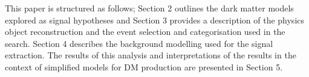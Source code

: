 

This paper is structured as follows; Section 2 outlines the dark matter models explored as signal hypotheses and Section 3 provides a 
description of the physics object reconstruction and the event selection and categorisation used in the search. Section 4 describes the 
background modelling used for the signal extraction. The results of this analysis and interpretations of the results in the context of 
simplified models for DM production are presented in Section 5.

